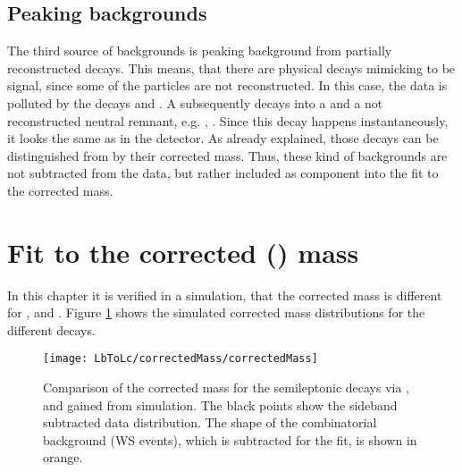 \subsection{Peaking backgrounds}
The third source of backgrounds is peaking background from partially reconstructed decays.
This means, that there are physical decays mimicking to be signal, since some of the particles are not reconstructed.
In this case, the \LbToLcmunu data is polluted by the decays  and  \cite{SL_Vub}.
A \Lcstar subsequently decays into a \Lc and a not reconstructed neutral remnant, e.g. \piz, \pip\pim.
Since this decay happens instantaneously, it looks the same as \LcTopKpi in the detector.
As already explained, those decays can be distinguished from \LbToLcmunu by their corrected \Lb mass.
Thus, these kind of backgrounds are not subtracted from the data, but rather included as component into the fit to the corrected \Lb mass.

\section{Fit to the corrected \pKpi\mun (\Lb) mass}
\label{sec:FitCorrectedMass}
In this chapter it is verified in a simulation, that the corrected \pKpi\mun mass is different for \LbToLcmunu,  and .
Figure \ref{fig:correctedMass_normalisation} shows the simulated corrected \pKpi\mun mass distributions for the different decays.
\begin{figure}[tbp]
	\centering
	\texttt{[image: LbToLc/correctedMass/correctedMass]}
	\caption{Comparison of the \pKpi\mun corrected mass for the semileptonic \Lb decays via \Lc,  and  gained from simulation. The black points show the sideband subtracted data distribution. The shape of the combinatorial \Lc\mun background (WS events), which is
    subtracted for the fit, is shown in orange.}
	\label{fig:correctedMass_normalisation}
\end{figure}

